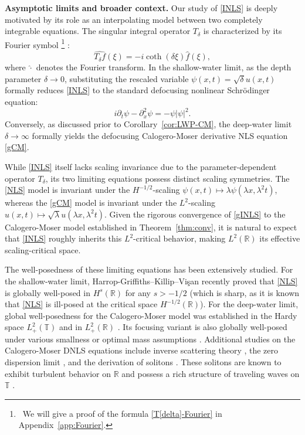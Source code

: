 \documentclass{amsart}
\numberwithin{equation}{section}
\newcommand{\R}{\mathbb{R}}
\newcommand{\Td}{T_{\delta}}
\begin{document}
\medskip
\noindent\textbf{Asymptotic limits and broader context.} 
Our study of \eqref{INLS} is deeply motivated by its role as an interpolating model between two completely integrable equations. 
The singular integral operator $\Td$ is characterized by its Fourier symbol%
\footnote{~We will give a proof of the formula \eqref{T[delta]-Fourier} in Appendix~\ref{app:Fourier}.}%
:
\begin{equation}\label{T[delta]-Fourier}
\widehat{\Td f}(\xi)=-i\coth(\delta\xi)\hat{f}(\xi),
\end{equation}
where $\widehat{\cdot}$ denotes the Fourier transform. 
In the shallow-water limit, as the depth parameter $\delta\to 0$, substituting the rescaled variable $\psi (x,t)=\sqrt{\delta}u(x,t)$ formally reduces \eqref{INLS} to the standard defocusing nonlinear Schr\"odinger equation:
\begin{equation}\label{NLS}\tag{NLS}
i\partial_t \psi-\partial_x^2 \psi =-\psi |\psi |^2.
\end{equation}
Conversely, as discussed prior to Corollary~\ref{cor:LWP-CM}, the deep-water limit $\delta\to \infty$ formally yields the defocusing Calogero-Moser derivative NLS equation \eqref{gCM}.

While \eqref{INLS} itself lacks scaling invariance due to the parameter-dependent operator $\Td$, its two limiting equations possess distinct scaling symmetries. 
The \eqref{NLS} model is invariant under the $H^{-1/2}$-scaling $\psi (x,t) \mapsto \lambda \psi (\lambda x, \lambda^2 t)$, whereas the \eqref{gCM} model is invariant under the $L^2$-scaling $u(x,t) \mapsto \sqrt{\lambda} u (\lambda x, \lambda^2 t)$. 
Given the rigorous convergence of \eqref{gINLS} to the Calogero-Moser model established in Theorem~\ref{thm:conv}, it is natural to expect that \eqref{INLS} roughly inherits this $L^2$-critical behavior, making $L^2(\mathbb{R})$ its effective scaling-critical space.

The well-posedness of these limiting equations has been extensively studied. 
For the shallow-water limit, Harrop-Griffiths--Killip--Vi\c{s}an \cite{HGKV} recently proved that \eqref{NLS} is globally well-posed in $H^{s}(\mathbb{R})$ for any $s>-1/2$ (which is sharp, as it is known that \eqref{NLS} is ill-posed at the critical space $H^{-1/2}(\mathbb{R})$). 
For the deep-water limit, global well-posedness for the Calogero-Moser model was established in the Hardy space $L^2_+(\mathbb{T})$ \cite{Badreddine1} and in $L^2_+(\mathbb{R})$ \cite{killip}. 
Its focusing variant is also globally well-posed under various smallness or optimal mass assumptions \cite{Badreddine1,GL,killip,Hogan-Kowalski,kim-kim-kwon,kim-Kwon,jJeong-Kim}. 
Additional studies on the Calogero-Moser DNLS equations include inverse scattering theory \cite{Matsuno7, Frank-Read}, the zero dispersion limit \cite{Matsuno3,Badreddine3}, and the derivation of solitons \cite{GL,Matsuno2,Matsuno4,Matsuno9,Matsuno5}. 
These solitons are known to exhibit turbulent behavior on $\R$ \cite{GL} and possess a rich structure of traveling waves on $\mathbb{T}$ \cite{Badreddine2,Matsuno2,Matsuno9,Matsuno5}.
 
\end{document}
